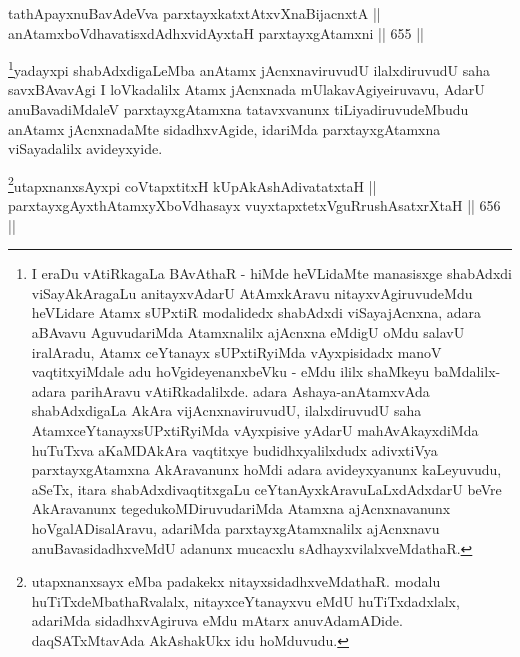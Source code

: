 \begin{shl}
tathA\s payxnuBavAdeVva parxtayxkatxtAtxvXnaBijacnxtA || \\
anAtamxboVdhavatisxdAdhx\s vidAyx\s taH parxtayxgAtamxni \hfill || 655 ||  
\end{shl}

\begin{artha}
\footnote{I eraDu vAtiRkagaLa BAvAthaR - hiMde heVLidaMte manasisxge
shabAdxdi viSayAkAragaLu anitayxvAdarU AtAmxkAravu
nitayxvAgiruvudeMdu heVLidare Atamx sUPxtiR modalidedx shabAdxdi
viSayajAcnxna, adara aBAvavu AguvudariMda Atamxnalilx ajAcnxna
eMdigU oMdu salavU iralAradu, Atamx ceYtanayx sUPxtiRyiMda
vAyxpisidadx manoV vaqtitxyiMdale adu hoVgideyenanxbeVku - eMdu
ililx  shaMkeyu baMdalilx-adara parihAravu vAtiRkadalilxde. adara
Ashaya-anAtamxvAda shabAdxdigaLa AkAra vijAcnxnaviruvudU,
ilalxdiruvudU saha AtamxceYtanayxsUPxtiRyiMda vAyxpisive yAdarU
mahAvAkayxdiMda huTuTxva aKaMDAkAra vaqtitxye budidhxyalilxdudx
adivxtiVya parxtayxgAtamxna AkAravanunx hoMdi adara avideyxyanunx
kaLeyuvudu, aSeTx, itara shabAdxdivaqtitxgaLu ceYtanAyxkAravuLaLxdAdxdarU beVre AkAravanunx tegedukoMDiruvudariMda
Atamxna ajAcnxnavanunx hoVgalADisalAravu, adariMda
parxtayxgAtamxnalilx ajAcnxnavu anuBavasidadhxveMdU adanunx mucacxlu
sAdhayxvilalxveMdathaR.}yadayxpi shabAdxdigaLeMba anAtamx jAcnxnaviruvudU
ilalxdiruvudU saha savxBAvavAgi I loVkadalilx Atamx jAcnxnada
mUlakavAgiye\break iruvavu, AdarU anuBavadiMdaleV parxtayxgAtamxna
tatavxvanunx tiLiyadiruvudeMbudu anAtamx jAcnxnadaMte sidadhxvAgide,
idariMda parxtayxgAtamxna viSayadalilx avideyxyide.
\end{artha}


\begin{shl}
\footnote{utapxnanxsayx eMba padakekx nitayxsidadhxveMdathaR. modalu huTiTxdeMbathaRvalalx, nitayxceYtanayxvu eMdU huTiTxdadxlalx, adariMda sidadhxvAgiruva eMdu mAtarx anuvAdamADide. daqSATxMtavAda AkAshakUkx idu hoMduvudu.}utapxnanxsAyxpi coVtapxtitxH kUpAkAshAdivatatxtaH ||  \\
parxtayxgAyxthAtamxyXboVdhasayx vuyxtapxtetxVguRrushAsatxrXtaH \hfill || 656 ||
\end{shl}

